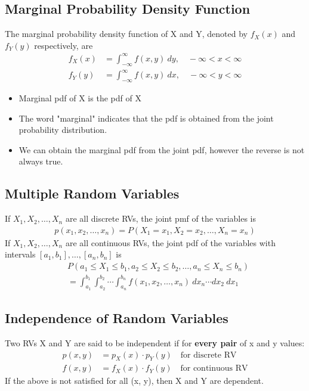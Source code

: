 \documentclass[a4paper]{article}
\begin{document}
\subsection{Marginal Probability Density Function}
The marginal probability density function of X and Y, denoted by $f_{X}(x)$ and $f_{Y}(y)$ respectively, are
\begin{align*}
    f_{X}(x) &= \int_{-\infty}^{\infty}f(x, y) \ dy, \quad -\infty< x< \infty\\
    f_{Y}(y) &= \int_{-\infty}^{\infty}f(x, y) \ dx, \quad -\infty< y< \infty
\end{align*}
\begin{itemize}
    \item Marginal pdf of X is the pdf of X
    \item The word "marginal" indicates that the pdf is obtained from the joint probability distribution.
    \item We can obtain the marginal pdf from the joint pdf, however the reverse is not always true.
\end{itemize}
\subsection{Multiple Random Variables}
If $X_{1}, X_{2}, \ldots, X_{n}$ are all discrete RVs, the joint pmf of the variables is
\begin{align*}
    p(x_{1}, x_{2}, \ldots, x_{n}) = P(X_{1} = x_{1}, X_{2} = x_{2}, \ldots, X_{n} = x_{n})
\end{align*}
If $X_{1}, X_{2}, \ldots, X_{n}$ are all continuous RVs, the joint pdf of the variables with intervals $[a_{1}, b_{1}], \ldots, [a_{n}, b_{n}]$ is 
\begin{align*}
    &P(a_{1}\leq X_{1} \leq b_{1},a_{2}\leq X_{2} \leq b_{2},\ldots, a_{n}\leq X_{n} \leq b_{n})\\
    &= \int_{a_{1}}^{b_{1}}\int_{a_{2}}^{b_{2}}\cdots\int_{a_{n}}^{b_{n}}f(x_{1}, x_{2}, \ldots, x_{n}) \ dx_{n} \cdots dx_{2} \ dx_{1}
\end{align*}
\subsection{Independence of Random Variables}
Two RVs X and Y are said to be independent if for \textbf{every pair} of x and y values:
\begin{align*}
    p(x, y) &= p_{X}(x)\cdot p_{Y}(y) \quad \text{for discrete RV}\\
    f(x, y) &= f_{X}(x)\cdot f_{Y}(y) \quad \text{for continuous RV}
\end{align*}
If the above is not satisfied for all (x, y), then X and Y are dependent.
\newpage
\end{document}
